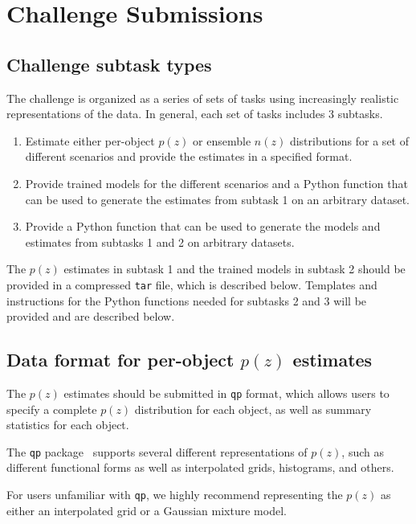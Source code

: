 \section{Challenge Submissions}
\label{sec:challenge_submissions}

\subsection{Challenge subtask types}

The challenge is organized as a series of sets of tasks using
increasingly realistic representations of the data. In general, each
set of tasks includes 3 subtasks.

\begin{enumerate}
  \item{Estimate either per-object $p(z)$ or ensemble $n(z)$
      distributions for a set of different scenarios and provide the
      estimates in a specified format.}
  \item{Provide trained models for the different scenarios and a
      Python function that can be used to generate the estimates from subtask
      1 on an arbitrary dataset.}    
  \item{Provide a Python function that can be used to
      generate the models and estimates from subtasks 1 and 2 on
      arbitrary datasets.}
\end{enumerate}

The $p(z)$ estimates in subtask 1 and the trained models in subtask 2 should be provided
in a compressed \texttt{tar} file, which is described below.   Templates and instructions for the
Python functions needed for subtasks 2 and 3 will be provided and are
described below.


\subsection{\texorpdfstring{Data format for per-object $p(z)$ estimates}{Data format for per-object p(z) estimates}}

The $p(z)$ estimates should be submitted in \texttt{qp} format,
which allows users to specify a complete $p(z)$ distribution for
each object, as well as summary statistics for each object.

The \texttt{qp} package~\cite{QP} supports several different representations of
$p(z)$, such as different functional forms as well as interpolated
grids, histograms, and others.

For users unfamiliar with \texttt{qp}, we highly recommend representing
the $p(z)$ as either an interpolated grid or a Gaussian mixture model.

